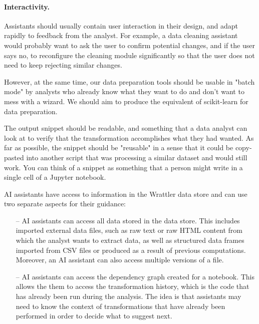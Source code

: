 \documentclass[sigplan,preprint,10pt]{acmart}\settopmatter{printfolios=true,printccs=false,printacmref=false}
\theoremstyle{plain}
\theoremstyle{definition}
\begin{document}
\paragraph{Interactivity.}
Assistants should usually contain user interaction in their design, and adapt rapidly to feedback 
from the analyst. For example, a data cleaning assistant would probably want to ask the user to 
confirm potential changes, and if the user says no, to reconfigure the cleaning module 
significantly so that the user does not need to keep rejecting similar changes. 

However, at the same time, our data preparation tools should be usable in "batch mode" by analysts 
who already know what they want to do and don't want to mess with a wizard. We should aim to 
produce the equivalent of scikit-learn for data preparation.

The output snippet should be readable, and something that a data analyst can look at to verify 
that the transformation accomplishes what they had wanted. As far as possible, the snippet 
should be "reusable" in a sense that it could be copy-pasted into another script that was 
processing a similar dataset and would still work. You can think of a snippet as something 
that a person might write in a single cell of a Jupyter notebook.


\vspace{1em}
AI assistants have access to information in the Wrattler data store and can use two separate
aspects for their guidance:
%
\begin{itemize}
\item[--] AI assistants can access all data stored in the data
store. This includes imported external data files, such as raw text or raw HTML content from which
the analyst wants to extract data, as well as structured data frames imported from CSV files or
produced as a result of previous computations. Moreover, an AI assistant can also access multiple
versions of a file.
\vspace{0.25em}

\item[--] AI assistants can access the dependency graph created for a 
notebook. This allows the them to access the transformation history, which is the code 
that has already been run during the analysis. The idea is that assistants may need to know the 
context of transformations that have already been performed in order to decide what to suggest next.
\end{itemize}
\end{document}
